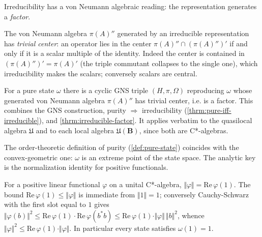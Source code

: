 Irreducibility has a von Neumann algebraic reading: the representation generates a \emph{factor}.

\begin{theorem}
    \label{thrm:irreducible-factor}
    \leanok
    The von Neumann algebra $\pi(A)''$ generated by an irreducible representation has \emph{trivial center}: an operator lies in the center $\pi(A)'' \cap (\pi(A)'')'$ if and only if it is a scalar multiple of the identity. Indeed the center is contained in $(\pi(A)'')' = \pi(A)'$ (the triple commutant collapses to the single one), which irreducibility makes the scalars; conversely scalars are central.
\end{theorem}

\begin{theorem}
    \label{thrm:pure-factor}
    \leanok
    For a pure state $\omega$ there is a cyclic GNS triple $(H, \pi, \Omega)$ reproducing $\omega$ whose generated von Neumann algebra $\pi(A)''$ has trivial center, i.e. is a factor. This combines the GNS construction, purity $\Rightarrow$ irreducibility (\ref{thrm:pure-iff-irreducible}), and \ref{thrm:irreducible-factor}. It applies verbatim to the quasilocal algebra $\mathfrak{U}$ and to each local algebra $\mathfrak{U}(\mathbf{B})$, since both are C*-algebras.
\end{theorem}

The order-theoretic definition of purity (\ref{def:pure-state}) coincides with the convex-geometric one: $\omega$ is an extreme point of the state space. The analytic key is the normalization identity for positive functionals.

\begin{theorem}
    \label{thrm:norm-positive-functional}
    \leanok
    For a positive linear functional $\varphi$ on a unital C*-algebra, $\Vert\varphi\Vert = \mathrm{Re}\,\varphi(1)$. The bound $\mathrm{Re}\,\varphi(1) \le \Vert\varphi\Vert$ is immediate from $\Vert 1\Vert = 1$; conversely Cauchy-Schwarz with the first slot equal to $1$ gives $\Vert\varphi(b)\Vert^2 \le \mathrm{Re}\,\varphi(1)\cdot\mathrm{Re}\,\varphi(b^* b) \le \mathrm{Re}\,\varphi(1)\cdot\Vert\varphi\Vert\,\Vert b\Vert^2$, whence $\Vert\varphi\Vert^2 \le \mathrm{Re}\,\varphi(1)\cdot\Vert\varphi\Vert$. In particular every state satisfies $\omega(1) = 1$.
\end{theorem}

